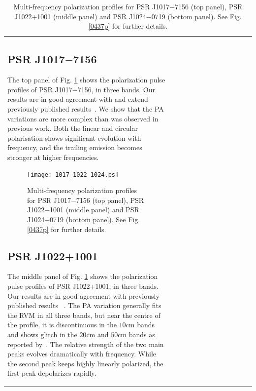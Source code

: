 \documentclass[useAMS,usenatbib]{mn2e}
\begin{document}
\begin{table}
\begin{center}
\begin{tabular}{lcccccccccccc}
%
%

\subsection{PSR J1017$-$7156}

The top panel of Fig. \ref{1017p} shows the polarization pulse profiles of 
PSR J1017$-$7156, in three bands.
%
Our results are in good agreement with and extend previously published 
results~\citep{Keith12}. 
%
We show that the PA variations are more complex than was observed in 
previous work.
%
%
Both the linear and  circular polarisation shows significant evolution 
with frequency, and the trailing emission becomes stronger at higher 
frequencies.



\begin{figure}
\begin{center}
\texttt{[image: 1017\_1022\_1024.ps]}
\caption{Multi-frequency polarization profiles for PSR J1017$-$7156 (top 
panel), PSR J1022$+$1001 (middle panel) and PSR J1024$-$0719 (bottom panel). 
See Fig. \ref{0437p} for further details.}
\label{1017p}
\end{center}
\end{figure}

\subsection{PSR J1022+1001}

The middle panel of Fig. \ref{1017p} shows the polarization pulse profiles 
of PSR J1022+1001, in three bands.
%
Our results are in good agreement with previously published results
~\citep{1022Kramer99,Stairs99,Ord04,Yan11}.
%
The PA variation generally fits the RVM in all three bands, but near the 
centre of the profile, it is discontinuous in the $10$cm bands and shows 
glitch in the $20$cm and $50$cm bands as reported by~\citet{Yan11}.
%
The relative strength of the two main peaks evolves dramatically with 
frequency.
%
While the second peak keeps highly linearly polarized, the first peak 
depolarizes rapidly.


\end{tabular}
\end{center}
\end{table}
\end{document}
